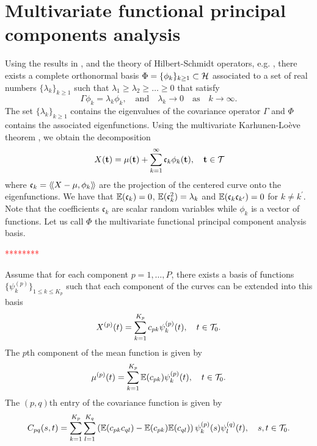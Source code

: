 \section{Multivariate functional principal components analysis} %
\label{sec:functional_principal_components_analysis}

Using the results in \cite{happMultivariateFunctionalPrincipal2015}, and the theory of Hilbert-Schmidt operators, e.g. \cite{reedMethodsModernMathematical1980}, there exists a complete orthonormal basis 
$\Phi = \{\phi_k\}_{k \geq 1} \subset \mathcal{H}$ associated to a set of real numbers $\{\lambda_k\}_{k \geq 1}$ such that $\lambda_1 \geq \lambda_2 \geq \dots \geq 0$ that satisfy
\begin{equation}\label{eq:eigendecomposition}
    \Gamma \phi_k = \lambda_k \phi_k, \quad\text{and}\quad \lambda_k \rightarrow 0 \quad\text{as}\quad k \rightarrow \infty.
\end{equation}
The set $\{\lambda_k\}_{k \geq 1}$ contains the eigenvalues of the covariance operator $\Gamma$ and $\Phi$ contains the associated eigenfunctions. Using the multivariate Karhunen-Loève theorem \citep{happMultivariateFunctionalPrincipal2015}, we obtain the decomposition
\begin{equation}
    X(\mathbf{t}) = \mu(\mathbf{t}) + \sum_{k = 1}^\infty \mathfrak{c}_k \phi_k(\mathbf{t}), \quad \mathbf{t} \in \mathcal{T}_{}
\end{equation}
where $\mathfrak{c}_{k} = \langle\!\langle X - \mu, \phi_k\rangle\!\rangle$ are the projection of the centered curve onto the eigenfunctions. We have that $\mathbb{E}(\mathfrak{c}_{k}) = 0$, $\mathbb{E}(\mathfrak{c}_{k}^2) = \lambda_k$ and $\mathbb{E}(\mathfrak{c}_{k}\mathfrak{c}_{k^\prime}) = 0$ for $k \neq k^\prime$. Note that the coefficients $\mathfrak{c}_k$ are scalar random variables while $\phi_k$ is a vector of functions. Let us call $\Phi$ the multivariate functional principal component analysis basis.

\textcolor{red}{********}

Assume that for each component $p = 1, \dots, P$, there exists a basis of functions $\{\psi_k^{(p)}\}_{1 \leq k \leq K_p}$ such that each component of the curves can be extended into this basis
\begin{equation}
X^{(p)}(t) = \sum_{k = 1}^{K_p} c_{pk}\psi_k^{(p)}(t), \quad t \in \mathcal{T}_{0}.
\end{equation} 
The $p$th component of the mean function is given by
\begin{equation}
    \mu^{(p)}(t) = \sum_{k = 1}^{K_p} \mathbb{E}(c_{pk})\psi_k^{(p)}(t), \quad t \in \mathcal{T}_{0}.
\end{equation}
The $(p, q)$th entry of the covariance function is given by
\begin{equation}
    C_{pq}(s, t) = \sum_{k = 1}^{K_p} \sum_{l = 1}^{K_q} \left(\mathbb{E}(c_{pk} c_{ql}) - \mathbb{E}(c_{pk})\mathbb{E}(c_{ql})\right)\psi_k^{(p)}(s)\psi_l^{(q)}(t), \quad s, t \in \mathcal{T}_{0}.
\end{equation}

